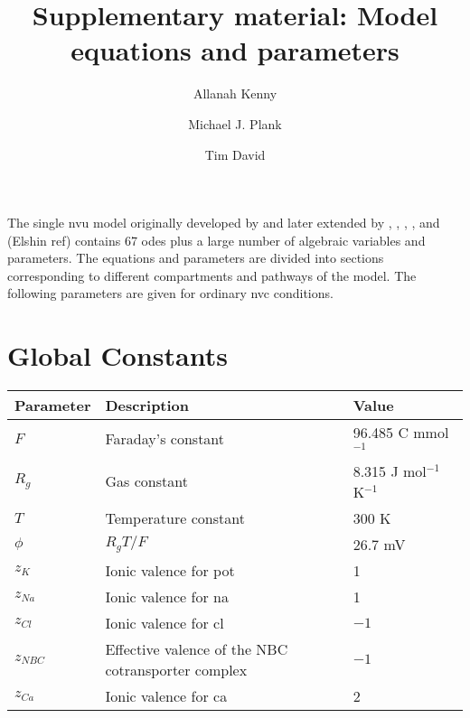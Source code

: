 \documentclass[11pt]{elsarticle}
\newcommand{\JmolK}{J mol$^{-1}$ K$^{-1}$\xspace}
\newcommand{\n}{$^{-1}$\xspace}
\newcommand{\na}{\gls{na}\xspace}
\newcommand{\pot}{\gls{pot}\xspace}
\newcommand{\cl}{\gls{cl}\xspace}
\newcommand{\ca}{\gls{ca}\xspace}
\begin{document}
\begin{frontmatter}
	
	\title{\vspace{-2cm}Supplementary material: Model equations and parameters}
	
	
	\author[1]{Allanah Kenny}
	\author[2]{Michael J. Plank}
	\author[1]{Tim David}
	
	\address[1]{High Performance Computing Centre, University of Canterbury, New Zealand}
	\address[2]{Department of Mathematics and Statistics, University of Canterbury, New Zealand}
	
\end{frontmatter}

The single \gls{nvu} model originally developed by \citet{Farr2011} and later extended by \citet{Dormanns2015}, \citet{Dormanns2016}, \citet{Mathias2017}, \citet{Kenny2018}, and (Elshin ref) contains 67 \glspl{ode} plus a large number of algebraic variables and parameters. The equations and parameters are divided into sections corresponding to different compartments and pathways of the model.
The following parameters are given for ordinary \gls{nvc} conditions.


\section{Global Constants}
\begin{longtable}[h!]{ p{0.12\linewidth}   p{0.6\linewidth}   p{0.28\linewidth} }
	\hline
	Parameter & Description & Value \\
	\hline

$F$			& Faraday's constant 	& 96.485 C mmol\n				\\
$R_g$ 			& Gas constant 				& 8.315 \JmolK	 \\
$T$ 	    	& Temperature constant								& 300 K	\\
$\phi$ 		& $R_g T / F$				& 26.7 mV \\		
$z_K$			& Ionic valence for \pot 										& 1   \\ 
$z_{Na}$			& Ionic valence for \na 											& 1   \\ 
$z_{Cl}$			& Ionic valence for \cl 											& $-1$  \\ 
$z_{NBC}$ 		& Effective valence of the NBC cotransporter complex 				& $-1$ \\
$z_{Ca}$  & Ionic valence for \ca & 2 \\
	\hline
\end{longtable}
\end{document}
